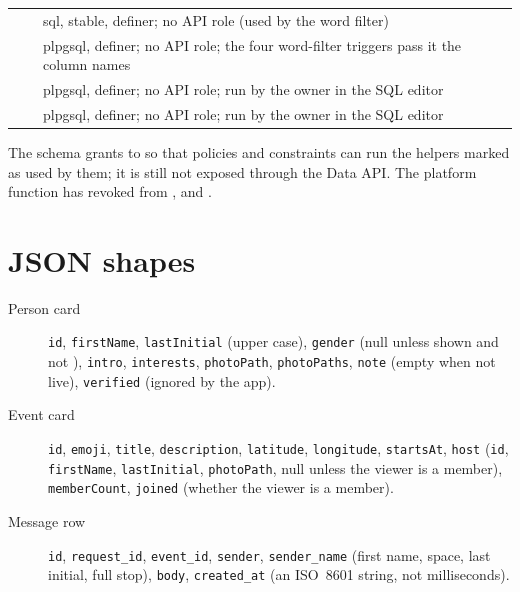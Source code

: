 \begin{longtable}{@{}L{58mm}L{24mm}L{\dimexpr\linewidth-82mm-4\tabcolsep\relax}@{}}
   &  & sql, stable, definer; no API role (used by the word filter) \\
   &  & plpgsql, definer; no API role; the four word-filter triggers pass it the column names \\
   &  & plpgsql, definer; no API role; run by the owner in the SQL editor \\
   &  & plpgsql, definer; no API role; run by the owner in the SQL editor \\
\end{longtable}
\endgroup

The schema  grants  to  so that policies and constraints can run
the helpers marked as used by them; it is still not exposed through the Data API. The
platform function  has  revoked from ,
 and .

\section{JSON shapes}

\begin{description}
  \item[Person card] \texttt{id}, \texttt{firstName}, \texttt{lastInitial} (upper case), \texttt{gender}
    (null unless shown and not ), \texttt{intro}, \texttt{interests},
    \texttt{photoPath}, \texttt{photoPaths}, \texttt{note} (empty when not live), \texttt{verified} (ignored by the app).
  \item[Event card] \texttt{id}, \texttt{emoji}, \texttt{title}, \texttt{description}, \texttt{latitude},
    \texttt{longitude}, \texttt{startsAt}, \texttt{host} (\texttt{id}, \texttt{firstName},
    \texttt{lastInitial}, \texttt{photoPath}, null unless the viewer is a member), \texttt{memberCount},
    \texttt{joined} (whether the viewer is a member).
  \item[Message row] \texttt{id}, \texttt{request\_id}, \texttt{event\_id}, \texttt{sender},
    \texttt{sender\_name} (first name, space, last initial, full stop), \texttt{body},
    \texttt{created\_at} (an ISO~8601 string, not milliseconds).
\end{description}
